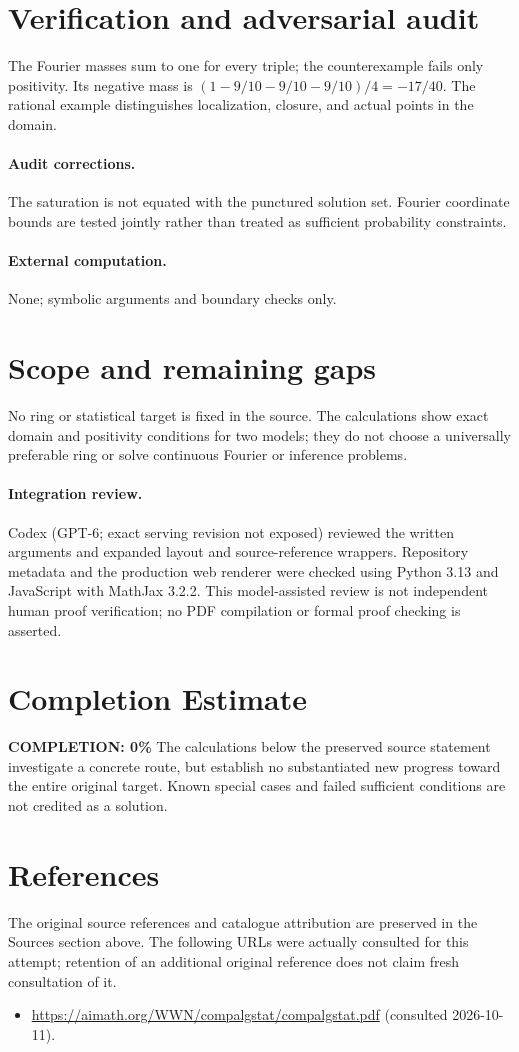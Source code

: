 \documentclass[11pt]{article}
\begin{document}
\section{Verification and adversarial audit}
The Fourier masses sum to one for every triple; the counterexample fails only positivity. Its negative mass is $(1-9/10-9/10-9/10)/4=-17/40$. The rational example distinguishes localization, closure, and actual points in the domain.
\paragraph{Audit corrections.} The saturation is not equated with the punctured solution set. Fourier coordinate bounds are tested jointly rather than treated as sufficient probability constraints.
\paragraph{External computation.} None; symbolic arguments and boundary checks only.
\section{Scope and remaining gaps}
No ring or statistical target is fixed in the source. The calculations show exact domain and positivity conditions for two models; they do not choose a universally preferable ring or solve continuous Fourier or inference problems.
\paragraph{Integration review.} Codex (GPT-6; exact serving revision not exposed) reviewed the written arguments and expanded layout and source-reference wrappers. Repository metadata and the production web renderer were checked using Python 3.13 and JavaScript with MathJax 3.2.2. This model-assisted review is not independent human proof verification; no PDF compilation or formal proof checking is asserted.

\section{Completion Estimate}
\noindent\textbf{COMPLETION: 0\%}
The calculations below the preserved source statement investigate a concrete route,
but establish no substantiated new progress toward the entire original target.
Known special cases and failed sufficient conditions are not credited as a solution.
\section{References}
The original source references and catalogue attribution are preserved in the
Sources section above. The following URLs were actually consulted for this attempt;
retention of an additional original reference does not claim fresh consultation of it.
\begin{itemize}
\item \url{https://aimath.org/WWN/compalgstat/compalgstat.pdf} (consulted 2026-10-11). 
\end{itemize}
\end{document}
